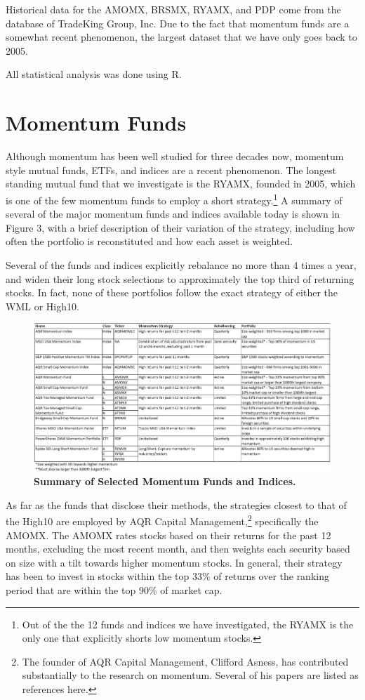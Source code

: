 \documentclass[12pt]{article}
\begin{document}
Historical data for the AMOMX, BRSMX, RYAMX, and PDP come from the database of TradeKing Group, Inc. Due to the fact that momentum funds are a somewhat recent phenomenon, the largest dataset that we have only goes back to 2005.

All statistical analysis was done using R.

\section{Momentum Funds} %

Although momentum has been well studied for three decades now, momentum style mutual funds, ETFs, and indices are a recent phenomenon. The longest standing mutual fund that we investigate is the RYAMX, founded in 2005, which is one of the few momentum funds to employ a short strategy.\footnote{Out of the the 12 funds and indices we have investigated, the RYAMX is the only one that explicitly shorts low momentum stocks.} A summary of several of the major momentum funds and indices available today is shown in Figure 3, with a brief description of their variation of the strategy, including how often the portfolio is reconstituted and how each asset is weighted.

Several of the funds and indices explicitly rebalance no more than 4 times a year, and widen their long stock selections to approximately the top third of returning stocks. In fact, none of these portfolios follow the exact strategy of either the WML or High10.

\begin{figure}[p]
\caption{\textbf{Summary of Selected Momentum Funds and Indices.}}
\centering
\includegraphics[angle=270, scale=0.65]{SummaryOfFundsIndices.jpg}
\end{figure}

As far as the funds that disclose their methods, the strategies closest to that of the High10 are employed by AQR Capital Management,\footnote{The founder of AQR Capital Management, Clifford Asness, has contributed substantially to the research on momentum. Several of his papers are listed as references here.} specifically the AMOMX. The AMOMX rates stocks based on their returns for the past 12 months, excluding the most recent month, and then weights each security based on size with a tilt towards higher momentum stocks. In general, their strategy has been to invest in stocks within the top 33\% of returns over the ranking period that are within the top 90\% of market cap. 
\end{document}
